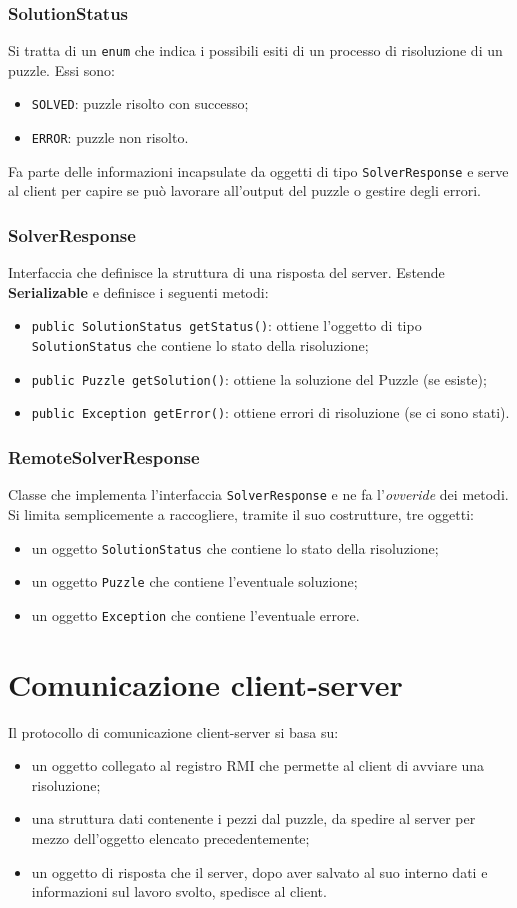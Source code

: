 \documentclass[a4paper, 12pt]{article}
\newcommand{\strong}[1]{ \textbf{#1}}
\begin{document}
\subsubsection{SolutionStatus}
Si tratta di un \verb|enum| che indica i possibili esiti di un processo di
risoluzione di un puzzle. Essi sono:
\begin{itemize}
\item \verb|SOLVED|: puzzle risolto con successo;
\item \verb|ERROR|: puzzle non risolto.
\end{itemize}
Fa parte delle informazioni incapsulate da oggetti di tipo \verb|SolverResponse|
e serve al client per capire se può lavorare all'output del puzzle o gestire
degli errori.
\subsubsection{SolverResponse}
Interfaccia che definisce la struttura di una risposta del server. Estende
\strong{Serializable} e definisce i seguenti metodi:
\begin{itemize}
\item \verb|public SolutionStatus getStatus()|: ottiene l'oggetto di tipo
\verb|SolutionStatus| che contiene lo stato della risoluzione;
\item \verb|public Puzzle getSolution()|: ottiene la soluzione del Puzzle (se
esiste);
\item \verb|public Exception getError()|: ottiene errori di risoluzione (se ci
sono stati).
\end{itemize}
\subsubsection{RemoteSolverResponse}
Classe che implementa l'interfaccia \verb|SolverResponse| e ne fa
l'\emph{ovveride} dei metodi. Si limita semplicemente a raccogliere, tramite il
suo costrutture, tre oggetti:
\begin{itemize}
\item un oggetto \verb|SolutionStatus| che contiene lo stato della risoluzione;
\item un oggetto \verb|Puzzle| che contiene l'eventuale soluzione;
\item un oggetto \verb|Exception| che contiene l'eventuale errore.
\end{itemize}

\section{Comunicazione client-server}
Il protocollo di comunicazione client-server si basa su:
\begin{itemize}
\item un oggetto collegato al registro RMI che permette al client di avviare una
risoluzione;
\item una struttura dati contenente i pezzi dal puzzle, da spedire al server
per mezzo dell'oggetto elencato precedentemente;
\item un oggetto di risposta che il server, dopo aver salvato al suo interno
dati e informazioni sul lavoro svolto, spedisce al client.
\end{itemize}
\end{document}
